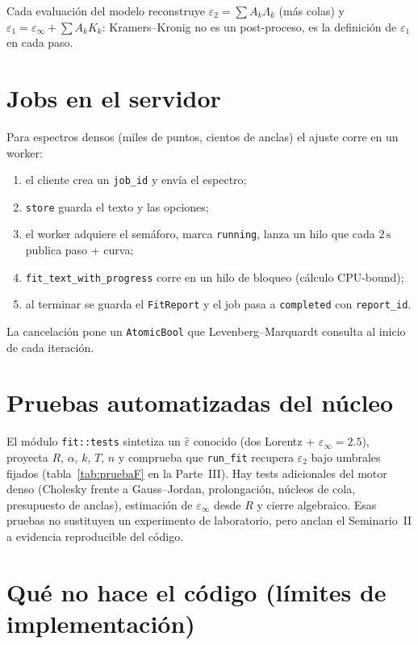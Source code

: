 Cada evaluaci\'on del modelo reconstruye $\varepsilon_2=\sum A_k\Lambda_k$ (m\'as colas) y $\varepsilon_1=\varepsilon_\infty+\sum A_k K_k$:
Kramers--Kronig no es un post-proceso, es la definici\'on de $\varepsilon_1$ en cada paso.

\section{Jobs en el servidor}

Para espectros densos (miles de puntos, cientos de anclas) el ajuste corre en un worker:
\begin{enumerate}[leftmargin=*]
\item el cliente crea un \texttt{job\_id} y env\'ia el espectro;
\item \texttt{store} guarda el texto y las opciones;
\item el worker adquiere el sem\'aforo, marca \texttt{running}, lanza un hilo que cada $2\,\mathrm{s}$ publica paso + curva;
\item \texttt{fit\_text\_with\_progress} corre en un hilo de bloqueo (c\'alculo CPU-bound);
\item al terminar se guarda el \texttt{FitReport} y el job pasa a \texttt{completed} con \texttt{report\_id}.
\end{enumerate}
La cancelaci\'on pone un \texttt{AtomicBool} que Levenberg--Marquardt consulta al inicio de cada iteraci\'on.

\section{Pruebas automatizadas del n\'ucleo}

El m\'odulo \texttt{fit::tests} sintetiza un $\hat\varepsilon$ conocido (dos Lorentz + $\varepsilon_\infty=2.5$), proyecta $R$, $\alpha$, $k$, $T$, $n$ y comprueba que \texttt{run\_fit} recupera $\varepsilon_2$ bajo umbrales fijados (tabla~\ref{tab:pruebaF} en la Parte~III).
Hay tests adicionales del motor denso (Cholesky frente a Gauss--Jordan, prolongaci\'on, n\'ucleos de cola, presupuesto de anclas), estimaci\'on de $\varepsilon_\infty$ desde $R$ y cierre algebraico.
Esas pruebas no sustituyen un experimento de laboratorio, pero anclan el Seminario~II a evidencia reproducible del c\'odigo.

\section{Qu\'e no hace el c\'odigo (l\'imites de implementaci\'on)}

